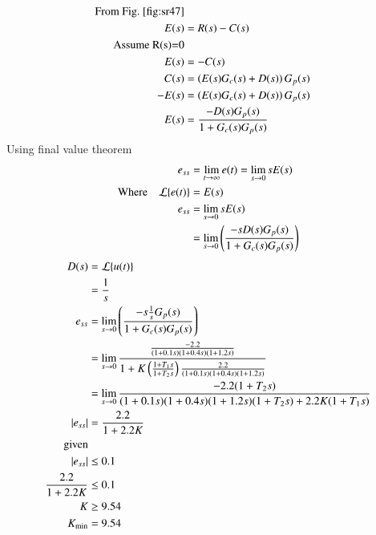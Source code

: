 \documentclass[journal,12pt,twocolumn]{IEEEtran}
\theoremstyle{remark}
\begin{document}
{\begin{align}
\text{From \figref{fig:sr47}}\notag\\
E(s) &= R(s)-C(s) \\
\text{Assume R(s)=0}\notag\\
E(s) &= -C(s) \\
C(s) &= \brak{E(s)G_c(s)+D(s)}G_p(s) \\
-E(s) &= \brak{E(s)G_c(s)+D(s)}G_p(s) \\
E(s) &= \frac{-D(s)G_p(s)}{1+G_c(s)G_p(s)} 
\end{align}
Using final value theorem 
\begin{align}
e_{ss} &= \lim_{{t \to \infty}} e(t) = \lim_{{s \to 0}} sE(s)\\
\text{Where}\quad\mathcal{L}\{e(t)\} &= E(s) \notag\\
e_{ss} &= \lim_{{s \to 0}} sE(s) \\
&= \lim_{{s \to 0}} \left(\frac{-sD(s)G_p(s)}{1+G_c(s)G_p(s)} \right) \\
\end{align}
\begin{align}
 D(s)&=\mathcal{L}\{u(t)\}  \notag\\
&=\frac{1}{s}\\
e_{ss} &=\lim_{{s \to 0}} \left(\frac{-s\frac{1}{s}G_p(s)}{1+G_c(s)G_p(s)} \right) \\
&= \lim_{{s \to 0}} \frac{\frac{-2.2}{(1+0.1s)(1+0.4s)(1+1.2s)}}{1+K\left(\frac{1+T_1s}{1+T_2s}\right)\frac{2.2}{(1+0.1s)(1+0.4s)(1+1.2s)}} \\
&= \lim_{{s \to 0}} \frac{-2.2(1+T_2s)}{(1+0.1s)(1+0.4s)(1+1.2s)(1+T_2s)+2.2K(1+T_1s)} \\
|e_{ss}| &= \frac{2.2}{1+2.2K} \\
\text{given}\notag\\ |e_{ss}|&\leq 0.1\\
\frac{2.2}{1+2.2K} &\leq 0.1 \\
K &\geq 9.54 \\
K_{\text{min}} &= 9.54
\end{align}}
\end{document}
